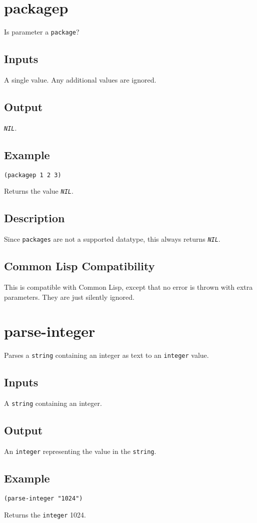 \documentclass[10pt, openany]{book}
\newcommand{\constant}[1]{\emph{\texttt{#1}}}
\newcommand{\datatype}[1]{\texttt{#1}}
\newcommand{\cl}{Common Lisp}
\begin{document}
\section{packagep}
Is parameter a \datatype{package}?
\subsection{Inputs}
A single value.  Any additional values are ignored.
\subsection{Output}
\constant{NIL}.
\subsection{Example}
\begin{lstlisting}
(packagep 1 2 3)
\end{lstlisting}
Returns the value \constant{NIL}.
\subsection{Description}
Since \datatype{packages} are not a supported datatype, this always returns \constant{NIL}.
\subsection{Common Lisp Compatibility}
This is compatible with \cl, except that no error is thrown with extra parameters.  They are just silently ignored.
\\
\section{parse-integer}
Parses a \datatype{string} containing an integer as text to an \datatype{integer} value.
\subsection{Inputs}
A \datatype{string} containing an integer.
\subsection{Output}
An \datatype{integer} representing the value in the \datatype{string}.
\subsection{Example}
\begin{lstlisting}
(parse-integer "1024")
\end{lstlisting}
Returns the \datatype{integer} 1024.
\end{document}
